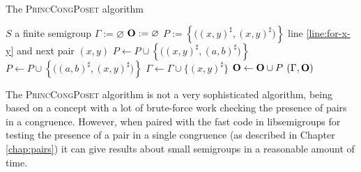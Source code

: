 \begin{algorithm}
  \caption{The \textsc{PrincCongPoset} algorithm}
  \label{alg:princ-cong-poset}
  \begin{algorithmic}[1]
    \Require $S$ a finite semigroup
      \State $\Gamma := \varnothing$
      \State $\mathbf{O} := \varnothing$
       \label{line:for-x-y}
        \State $P := \left\{\big((x,y)^\sharp, (x,y)^\sharp\big)\right\}$
              \State \Goto line \ref{line:for-x-y} and next pair $(x,y)$
            \Else
              \State $P \gets P \cup
                \left\{\big((x,y)^\sharp, (a,b)^\sharp\big)\right\}$
            \EndIf
              \State $P \gets P \cup
                \left\{\big((a,b)^\sharp, (x,y)^\sharp\big)\right\}$
          \EndIf
        \EndFor
        \State $\Gamma \gets \Gamma \cup \{(x,y)^\sharp\}$
        \State $\mathbf{O} \gets \mathbf{O} \cup P$
      \EndFor
      \State \Return $(\Gamma, \mathbf{O})$
    \EndProcedure
  \end{algorithmic}
\end{algorithm}

The \textsc{PrincCongPoset} algorithm is not a very sophisticated algorithm,
being based on a concept with a lot of brute-force work checking the presence of
pairs in a congruence.  However, when paired with the fast code in libsemigroups
\cite{libsemigroups} for testing the presence of a pair in a single congruence
(as described in Chapter \ref{chap:pairs}) it can give results about small
semigroups in a reasonable amount of time.


